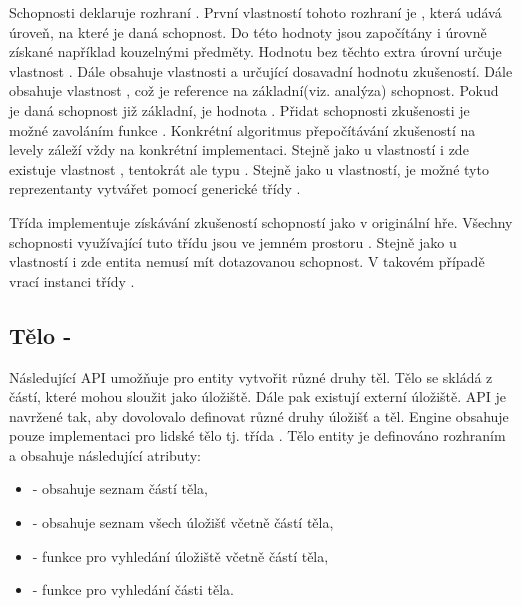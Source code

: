 Schopnosti deklaruje rozhraní . První vlastností tohoto rozhraní je , která udává úroveň,
na které je daná schopnost. Do této hodnoty jsou započítány i úrovně získané například kouzelnými předměty. Hodnotu
bez těchto extra úrovní určuje vlastnost . Dále obsahuje vlastnosti  a 
určující dosavadní hodnotu zkušeností. Dále obsahuje vlastnost , což je reference na základní(viz. analýza) schopnost. Pokud
je daná schopnost již základní, je hodnota . Přidat schopnosti zkušenosti je možné zavoláním funkce .
Konkrétní algoritmus přepočítávání zkušeností na levely záleží vždy  na konkrétní implementaci. Stejně jako u vlastností 
i zde existuje vlastnost , tentokrát ale typu . Stejně jako u vlastností, je možné tyto reprezentanty
vytvářet pomocí generické třídy . 

Třída  implementuje získávání zkušeností schopností jako v originální hře. Všechny schopnosti 
využívající tuto třídu jsou ve jemném prostoru . Stejně jako
u vlastností i zde entita nemusí mít dotazovanou schopnost. V takovém případě vrací instanci třídy .

\subsection{Tělo - }

Následující API umožňuje pro entity vytvořit různé druhy těl.
Tělo se skládá z částí, které mohou sloužit jako úložiště. Dále pak existují externí
úložiště. API je navržené tak, aby dovolovalo definovat různé druhy úložišť a těl. 
Engine obsahuje pouze implementaci pro lidské tělo tj. třída .
Tělo entity je definováno rozhraním  a obsahuje následující atributy:

\begin{itemize}
\item {} - obsahuje seznam částí těla,
\item {} - obsahuje seznam všech úložišť včetně částí těla,
\item {} - funkce pro vyhledání úložiště včetně částí těla,
\item {} - funkce  pro vyhledání části těla. 
\end{itemize}

